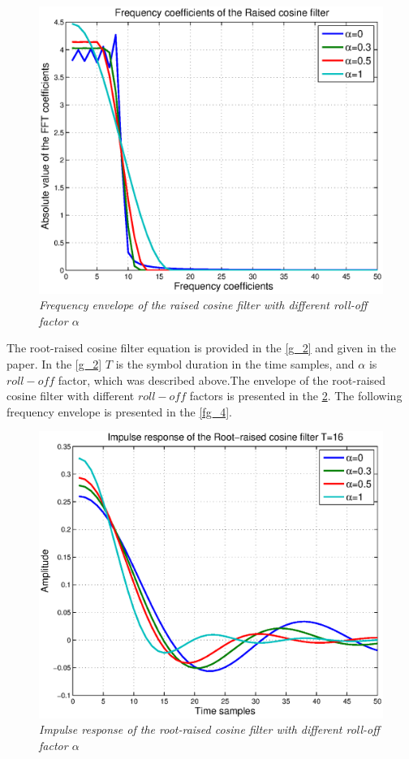 \begin{figure}[H]
\centering
\includegraphics[width=0.9\columnwidth]{RC_freq.eps}
\caption{\textit{Frequency envelope of the raised cosine filter with different roll-off factor $\alpha$}} 
\label{fg_2}
\end{figure}
The root-raised cosine filter equation is provided in the \eqref{g_2} and given in the \cite{Book34} paper. In the \eqref{g_2} $T$ is the symbol duration in the time samples, and $\alpha$ is $roll-off$ factor, which was described above.The envelope of the root-raised cosine filter with different $roll-off$ factors is presented in the \ref{fg_3}. The following frequency envelope is presented in the \ref{fg_4}.
\begin{figure}[H]
\centering
\includegraphics[width=0.9\columnwidth]{RRC_time.eps}
\caption{\textit{Impulse response of the root-raised cosine filter with different roll-off factor $\alpha$}} \label{fg_3}
\end{figure}

